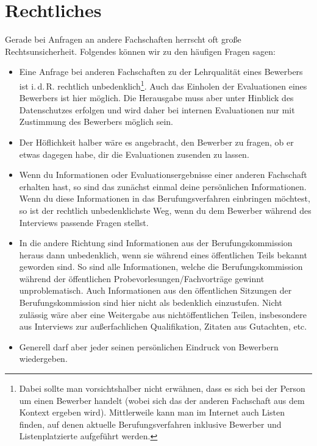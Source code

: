 \section{Rechtliches}\label{sec:rechtliches}
Gerade bei Anfragen an andere Fachschaften herrscht oft große Rechtsunsicherheit. Folgendes können wir zu den häufigen Fragen sagen:
\begin{itemize}
    \item Eine Anfrage bei anderen Fachschaften zu der Lehrqualität eines Bewerbers ist i.\,d.\,R. rechtlich unbedenklich\footnote{Dabei sollte man vorsichtshalber nicht erwähnen, dass es sich bei der Person um einen Bewerber handelt (wobei sich das der anderen Fachschaft aus dem Kontext ergeben wird). Mittlerweile
              kann man im Internet auch Listen finden, auf denen aktuelle Berufungsverfahren inklusive Bewerber und Listenplatzierte aufgeführt werden.}. Auch das Einholen der Evaluationen eines Bewerbers ist hier möglich. Die Herausgabe muss aber unter Hinblick des Datenschutzes erfolgen und wird daher bei internen Evaluationen nur mit Zustimmung des Bewerbers möglich sein.

    \item Der Höflichkeit halber wäre es angebracht, den Bewerber zu fragen, ob er etwas dagegen habe, dir die Evaluationen zusenden zu lassen.

    \item Wenn du Informationen oder Evaluationsergebnisse einer anderen Fachschaft erhalten hast, so sind das zunächst einmal deine persönlichen Informationen. Wenn du diese Informationen in das Berufungsverfahren einbringen möchtest, so ist der rechtlich unbedenklichste Weg, wenn du dem Bewerber während des Interviews passende Fragen stellst.

    \item In die andere Richtung sind Informationen aus der Berufungskommission heraus dann unbedenklich, wenn sie während eines öffentlichen Teils bekannt geworden sind. So sind alle Informationen, welche die Berufungskommission während der öffentlichen Probevorlesungen/Fachvorträge gewinnt unproblematisch. Auch Informationen aus den öffentlichen Sitzungen der Berufungskommission sind hier nicht als bedenklich einzustufen. Nicht zulässig wäre aber eine Weitergabe aus nichtöffentlichen Teilen, insbesondere aus Interviews zur außerfachlichen Qualifikation, Zitaten aus Gutachten, etc.

    \item Generell darf aber jeder seinen persönlichen Eindruck von Bewerbern wiedergeben.
\end{itemize}

